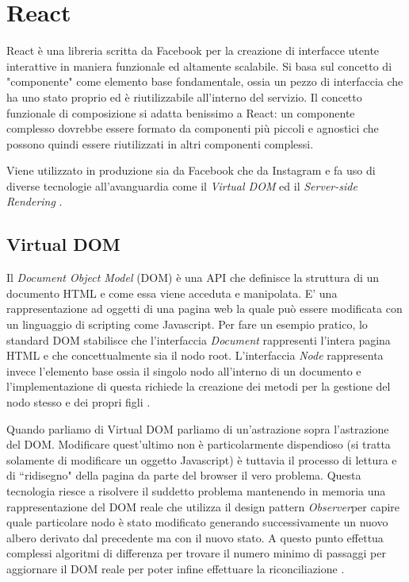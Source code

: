 \section{React}
React è una libreria scritta da Facebook per la creazione di interfacce utente interattive in maniera funzionale ed altamente scalabile. Si basa sul concetto di "componente" come elemento base fondamentale, ossia un pezzo di interfaccia che ha uno stato proprio ed è riutilizzabile all'interno del servizio. Il concetto funzionale di composizione si adatta benissimo a React: un componente complesso dovrebbe essere formato da componenti più piccoli e agnostici che possono quindi essere riutilizzati in altri componenti complessi.

Viene utilizzato in produzione sia da Facebook che da Instagram e fa uso di diverse tecnologie all'avanguardia come il \textit{Virtual DOM} ed il \textit{Server-side Rendering} \cite{WheelerOnReact}.

\subsection{Virtual DOM}
Il  \textit{Document Object Model} (DOM) è una API che definisce la struttura di un documento HTML e come essa viene acceduta e manipolata. E' una rappresentazione ad oggetti di una pagina web la quale può essere modificata con un linguaggio di scripting come Javascript.
Per fare un esempio pratico, lo standard DOM stabilisce che l'interfaccia \textit{Document} rappresenti l'intera pagina HTML e che concettualmente sia il nodo root. L'interfaccia \textit{Node} rappresenta invece l'elemento base ossia il singolo nodo all'interno di un documento e l'implementazione di questa richiede la creazione dei metodi per la gestione del nodo stesso e dei propri figli \cite{HWRWhatIsDOM}.

Quando parliamo di Virtual DOM parliamo di un'astrazione sopra l'astrazione del DOM. Modificare quest'ultimo non è particolarmente dispendioso (si tratta solamente di modificare un oggetto Javascript) è tuttavia il processo di lettura e di “ridisegno" della pagina da parte del browser il vero problema. Questa tecnologia riesce a risolvere il suddetto problema mantenendo in memoria una rappresentazione del DOM reale che utilizza il design pattern \textit{Observer}\footnotemark per capire quale particolare nodo è stato modificato generando successivamente un nuovo albero derivato dal precedente ma con il nuovo stato. A questo punto effettua complessi algoritmi di differenza per trovare il numero minimo di passaggi per aggiornare il DOM reale per poter infine effettuare la riconciliazione \cite{MishraOnVirtualDOM}.

